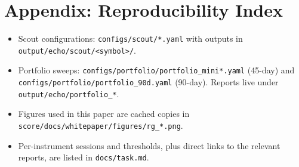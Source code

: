 \documentclass[11pt]{article}
\begin{document}
\section*{Appendix: Reproducibility Index}
\begin{itemize}
  \item Scout configurations: \texttt{configs/scout/*.yaml} with
        outputs in \texttt{output/echo/scout/<symbol>/}.
  \item Portfolio sweeps: \texttt{configs/portfolio/portfolio\_mini*.yaml}
        (45-day) and \texttt{configs/portfolio/portfolio\_90d.yaml}
        (90-day).  Reports live under \texttt{output/echo/portfolio\_*}.
  \item Figures used in this paper are cached copies in
        \texttt{score/docs/whitepaper/figures/rg\_*.png}.
  \item Per-instrument sessions and thresholds, plus direct links to
        the relevant reports, are listed in \texttt{docs/task.md}.
\end{itemize}
\end{document}
